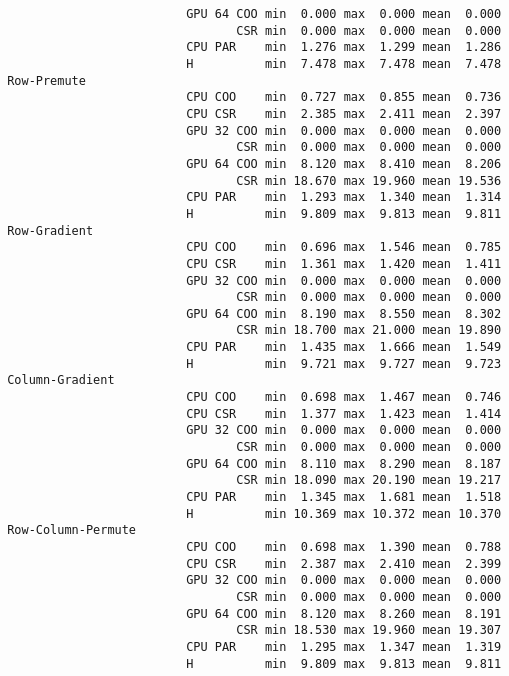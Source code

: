 \begin{verbatim}
                          GPU 64 COO min  0.000 max  0.000 mean  0.000
                                 CSR min  0.000 max  0.000 mean  0.000
                          CPU PAR    min  1.276 max  1.299 mean  1.286
                          H          min  7.478 max  7.478 mean  7.478
 Row-Premute
                          CPU COO    min  0.727 max  0.855 mean  0.736
                          CPU CSR    min  2.385 max  2.411 mean  2.397
                          GPU 32 COO min  0.000 max  0.000 mean  0.000
                                 CSR min  0.000 max  0.000 mean  0.000
                          GPU 64 COO min  8.120 max  8.410 mean  8.206
                                 CSR min 18.670 max 19.960 mean 19.536
                          CPU PAR    min  1.293 max  1.340 mean  1.314
                          H          min  9.809 max  9.813 mean  9.811
 Row-Gradient
                          CPU COO    min  0.696 max  1.546 mean  0.785
                          CPU CSR    min  1.361 max  1.420 mean  1.411
                          GPU 32 COO min  0.000 max  0.000 mean  0.000
                                 CSR min  0.000 max  0.000 mean  0.000
                          GPU 64 COO min  8.190 max  8.550 mean  8.302
                                 CSR min 18.700 max 21.000 mean 19.890
                          CPU PAR    min  1.435 max  1.666 mean  1.549
                          H          min  9.721 max  9.727 mean  9.723
 Column-Gradient
                          CPU COO    min  0.698 max  1.467 mean  0.746
                          CPU CSR    min  1.377 max  1.423 mean  1.414
                          GPU 32 COO min  0.000 max  0.000 mean  0.000
                                 CSR min  0.000 max  0.000 mean  0.000
                          GPU 64 COO min  8.110 max  8.290 mean  8.187
                                 CSR min 18.090 max 20.190 mean 19.217
                          CPU PAR    min  1.345 max  1.681 mean  1.518
                          H          min 10.369 max 10.372 mean 10.370
 Row-Column-Permute
                          CPU COO    min  0.698 max  1.390 mean  0.788
                          CPU CSR    min  2.387 max  2.410 mean  2.399
                          GPU 32 COO min  0.000 max  0.000 mean  0.000
                                 CSR min  0.000 max  0.000 mean  0.000
                          GPU 64 COO min  8.120 max  8.260 mean  8.191
                                 CSR min 18.530 max 19.960 mean 19.307
                          CPU PAR    min  1.295 max  1.347 mean  1.319
                          H          min  9.809 max  9.813 mean  9.811

\end{verbatim}
